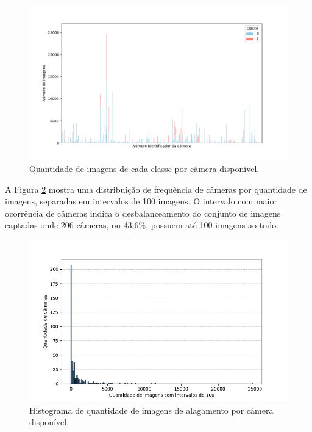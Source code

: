 \begin{figure}[htb]
    \centerline{\includegraphics[width=1\linewidth]{images/totalcount_code.png}}
    \caption{Quantidade de imagens de cada classe por câmera disponível.}
    \label{fig:totalcount}
\end{figure}

A Figura \ref{fig:histcodes} mostra uma distribuição de frequência de câmeras por quantidade de imagens, separadas em intervalos de 100 imagens.
O intervalo com maior ocorrência de câmeras indica o desbalanceamento do conjunto de imagens captadas onde 206 câmeras, ou 43,6\%, possuem até 100 imagens ao todo. 

\begin{figure}[htb]
    \centerline{\includegraphics[width=1\linewidth]{images/metodologia/histcodes.png}}
    \caption{Histograma de quantidade de imagens de alagamento por câmera disponível.}
    \label{fig:histcodes}
\end{figure}


